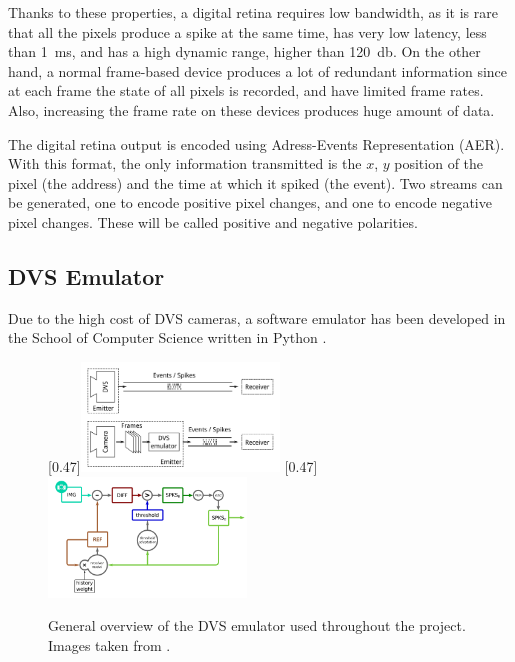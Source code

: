 Thanks to these properties, a digital retina requires low bandwidth, as it is rare that all the pixels produce a spike at the same time, has very low latency, less than \SI{1}{\milli\second}, and has a high dynamic range, higher than \SI{120}{\decibel}. On the other hand, a normal frame-based device produces a lot of redundant information since at each frame the state of all pixels is recorded, and have limited frame rates. Also, increasing the frame rate on these devices produces huge amount of data.

The digital retina output is encoded using Adress-Events Representation (AER). With this format, the only information transmitted is the $x$, $y$ position of the pixel (the address) and the time at which it spiked (the event). Two streams can be generated, one to encode positive pixel changes, and one to encode negative pixel changes. These will be called positive and negative polarities.  


\subsection{DVS Emulator}
Due to the high cost of DVS cameras, a software emulator has been developed in the School of Computer Science written in Python \cite{Garcia2017}.

\begin{figure}[ht]
\centering
{}
  [0.47\textwidth]{\includegraphics[width=0.47\textwidth]{images/context/dvs_comparison.png}}
  [0.47\textwidth]{\includegraphics[width=0.47\textwidth]{images/context/dvs_diagram.png}}
\caption[DVS Emulator]{General overview of the DVS emulator used throughout the project. Images taken from \cite{Garcia2017}.}
\label{fig:dvs_emulator}
\end{figure}


